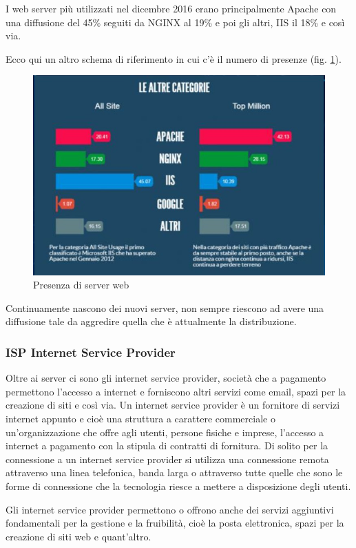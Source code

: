 I web server più utilizzati nel dicembre 2016 erano principalmente Apache con una diffusione del 45\% seguiti da NGINX al 19\% e poi gli altri, IIS il 18\% e così via. 

Ecco qui un altro schema di riferimento in cui c'è il numero di presenze (fig. \ref{fig:presenza di server web}).
\begin{figure}[ht]
    \centering
    \includegraphics[width=0.8\linewidth]{images/03_lez_fig_03.jpg}
    \caption{Presenza di server web}
    \label{fig:presenza di server web}
\end{figure}

Continuamente nascono dei nuovi server, non sempre riescono ad avere una diffusione tale da aggredire quella che è attualmente la distribuzione.

\subsubsection{ISP Internet Service Provider}

Oltre ai server ci sono gli internet service provider, società che a pagamento permettono l'accesso a internet e forniscono altri servizi come email, spazi per la creazione di siti e così via. Un internet service provider è un fornitore di servizi internet appunto e cioè una struttura a carattere commerciale o un'organizzazione che offre agli utenti, persone fisiche e imprese, l'accesso a internet a pagamento con la stipula di contratti di fornitura. Di solito per la connessione a un internet service provider si utilizza una connessione remota attraverso una linea telefonica, banda larga o attraverso tutte quelle che sono le forme di connessione che la tecnologia riesce a mettere a disposizione degli utenti.

Gli internet service provider permettono o offrono anche dei servizi aggiuntivi fondamentali per la gestione e la fruibilità, cioè la posta elettronica, spazi per la creazione di siti web e quant'altro.

